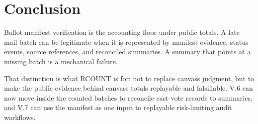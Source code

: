 \section{Conclusion}

Ballot manifest verification is the accounting floor under public totals. A
late mail batch can be legitimate when it is represented by manifest evidence,
status events, source references, and reconciled summaries. A summary that
points at a missing batch is a mechanical failure.

That distinction is what RCOUNT is for: not to replace canvass judgment, but to
make the public evidence behind canvass totals replayable and falsifiable.
V.6 can now move inside the counted batches to reconcile cast-vote records to
summaries, and V.7 can use the manifest as one input to replayable
risk-limiting audit workflows.
